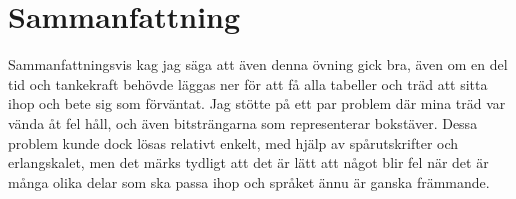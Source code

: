 \documentclass[a4paper, 11pt]{article}
\begin{document}
\section{Sammanfattning}

Sammanfattningsvis kag jag säga att även denna övning gick bra, även om en
del tid och tankekraft behövde läggas ner för att få alla tabeller och träd
att sitta ihop och bete sig som förväntat. Jag stötte på ett par problem där
mina träd var vända åt fel håll, och även bitsträngarna som representerar
bokstäver. Dessa problem kunde dock lösas relativt enkelt, med hjälp av
spårutskrifter och erlangskalet, men det märks tydligt att det är lätt att
något blir fel när det är många olika delar som ska passa ihop och språket
ännu är ganska främmande.
\end{document}
